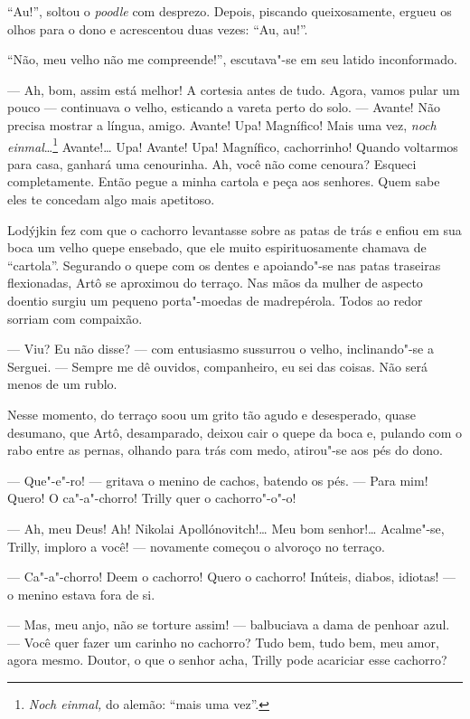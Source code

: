 ``Au!'', soltou o \emph{poodle} com desprezo. Depois, piscando queixosamente,
ergueu os olhos para o dono e acrescentou duas vezes: ``Au, au!''.

``Não, meu velho não me compreende!'', escutava"-se em seu latido
inconformado.

--- Ah, bom, assim está melhor! A cortesia antes de tudo. Agora, vamos
pular um pouco --- continuava o velho, esticando a vareta perto do solo.
--- Avante! Não precisa mostrar a língua, amigo. Avante! Upa! Magnífico!
Mais uma vez, \emph{noch einmal}\ldots{}\footnote{\emph{Noch einmal,} do
  alemão: ``mais uma vez''.} Avante!\ldots{} Upa! Avante! Upa! Magnífico,
cachorrinho! Quando voltarmos para casa, ganhará uma cenourinha. Ah,
você não come cenoura? Esqueci completamente. Então pegue a minha
cartola e peça aos senhores. Quem sabe eles te concedam algo mais
apetitoso.

Lodýjkin fez com que o cachorro levantasse sobre as patas de trás e
enfiou em sua boca um velho quepe ensebado, que ele muito
espirituosamente chamava de ``cartola''. Segurando o quepe com os dentes
e apoiando"-se nas patas traseiras flexionadas, Artô se aproximou do
terraço. Nas mãos da mulher de aspecto doentio surgiu um pequeno
porta"-moedas de madrepérola. Todos ao redor sorriam com compaixão.

--- Viu? Eu não disse? --- com entusiasmo sussurrou o velho,
inclinando"-se a Serguei. --- Sempre me dê ouvidos, companheiro, eu sei
das coisas. Não será menos de um rublo.

Nesse momento, do terraço soou um grito tão agudo e desesperado, quase
desumano, que Artô, desamparado, deixou cair o quepe da boca e, pulando
com o rabo entre as pernas, olhando para trás com medo, atirou"-se aos
pés do dono.

--- Que"-e"-ro! --- gritava o menino de cachos, batendo os pés. --- Para
mim! Quero! O ca"-a"-chorro! Trilly
quer o cachorro"-o"-o!

--- Ah, meu Deus! Ah! Nikolai Apollónovitch!\ldots{} Meu bom senhor!\ldots{}
Acalme"-se, Trilly, imploro a você! --- novamente começou o alvoroço no
terraço.

--- Ca"-a"-chorro! Deem o cachorro! Quero o cachorro! Inúteis, diabos,
idiotas! --- o menino estava fora de si.

--- Mas, meu anjo, não se torture assim! --- balbuciava a dama de
penhoar azul. --- Você quer fazer um carinho no cachorro? Tudo bem, tudo
bem, meu amor, agora mesmo. Doutor, o que o senhor acha, Trilly pode
acariciar esse cachorro?

